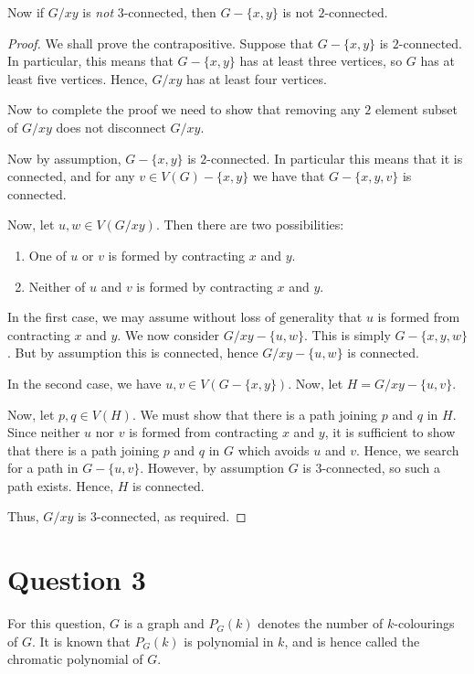 \documentclass{unswmaths}
\begin{document}
\begin{proposition}[Part (b)]
    Now if $G/xy$ is \emph{not} $3$-connected, then $G-\{x,y\}$ is not
    $2$-connected.
\end{proposition}
\begin{proof}
    We shall prove the contrapositive. Suppose that $G-\{x,y\}$
    is $2$-connected. In particular, this means that $G-\{x,y\}$
    has at least three vertices, so $G$ has at least five vertices.
    Hence, $G/xy$ has at least four vertices. 
    
    Now to complete the proof we need to show that removing any $2$ element
    subset of $G/xy$ does not disconnect $G/xy$. 
    
    Now by assumption, $G-\{x,y\}$ is $2$-connected. In particular
    this means that it is connected, and for any $v \in V(G)-\{x,y\}$
    we have that $G-\{x,y,v\}$ is connected.
    
    Now, let $u,w \in V(G/xy)$. Then there are two possibilities:
    \begin{enumerate}
        \item{} One of $u$ or $v$ is formed by contracting $x$ and $y$.
        \item{} Neither of $u$ and $v$ is formed by contracting $x$ and $y$.
    \end{enumerate}
    In the first case, we may assume without loss of generality that $u$
    is formed from contracting $x$ and $y$. We now
    consider $G/xy-\{u,w\}$. This is simply $G-\{x,y,w\}$. But by assumption
    this is connected, hence $G/xy-\{u,w\}$ is connected.
    
    In the second case, we have $u,v \in V(G-\{x,y\})$. Now, let $H = G/xy-\{u,v\}$.
    
    Now, let $p,q \in V(H)$. We must show that there is a path joining $p$ and $q$
    in $H$. Since neither $u$ nor $v$
    is formed from contracting $x$ and $y$, it is sufficient to show that there is a path joining $p$
    and $q$ in $G$ which avoids $u$ and $v$. Hence, we search for a path
    in $G-\{u,v\}$. However, by assumption $G$ is $3$-connected, so such a path exists.
    Hence, $H$ is connected. 
    
    Thus, $G/xy$ is $3$-connected, as required.
\end{proof}

\section*{Question 3}
For this question, $G$ is a graph and $P_G(k)$ denotes
the number of $k$-colourings of $G$. It is known that $P_G(k)$
is polynomial in $k$, and is hence called the chromatic polynomial of $G$.
\end{document}
